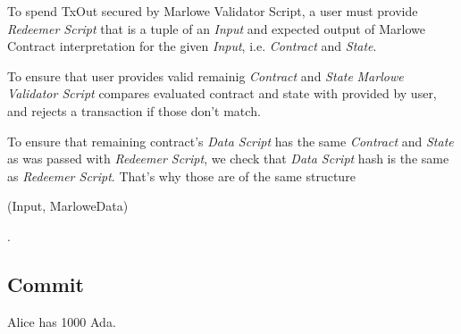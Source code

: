 \documentclass[11pt,a4paper]{article}
\begin{document}
To spend TxOut secured by Marlowe Validator Script, a user must provide \emph{Redeemer Script}
that is a tuple of an \emph{Input} and expected output of Marlowe Contract interpretation for
the given \emph{Input}, i.e. \emph{Contract} and \emph{State}.

To ensure that user provides valid remainig \emph{Contract} and \emph{State}
\emph{Marlowe Validator Script} compares evaluated contract and state with provided by user,
and rejects a transaction if those don't match.

To ensure that remaining contract's \emph{Data Script} has the same \emph{Contract} and \emph{State}
as was passed with \emph{Redeemer Script}, we check that \emph{Data Script} hash is
the same as \emph{Redeemer Script}.
That's why those are of the same structure \begin{spec} (Input, MarloweData) \end{spec}.

\begin{figure}[!h]
\centering
{}
\end{figure}


\subsection{Commit}

Alice has 1000 Ada.
\end{document}
